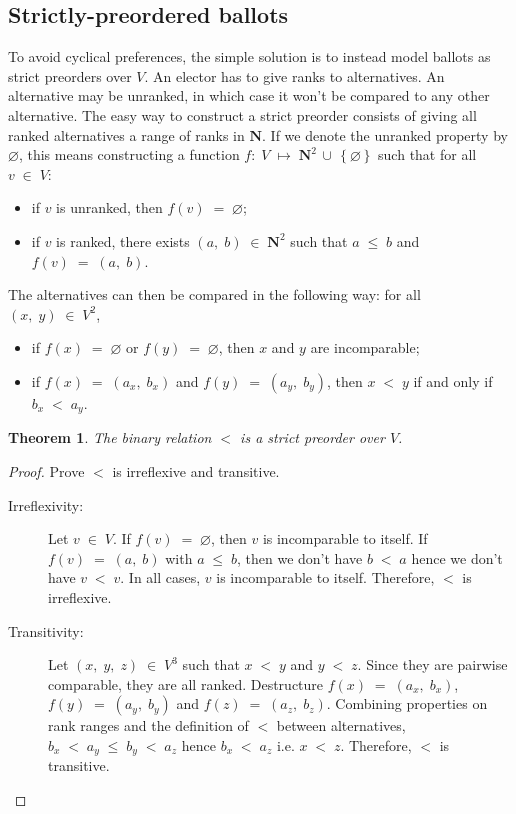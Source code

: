 \documentclass{report}
\theoremstyle{definition}
\theoremstyle{plain}
\newtheorem{thm}{Theorem}
\begin{document}
\subsection{Strictly-preordered ballots}
To avoid cyclical preferences, the simple solution is to instead model ballots
as strict preorders over $V$. An elector has to give ranks to alternatives. An
alternative may be unranked, in which case it won't be compared to any other
alternative. The easy way to construct a strict preorder consists of giving all
ranked alternatives a range of ranks in $\mathbf N$. If we denote the unranked
property by $\varnothing$, this means constructing a function
$f:\;V\;\longmapsto\;\mathbf N^2\,\cup\,\left\{\varnothing\right\}$ such that
for all $v\;\in\;V$:
\begin{itemize}
\item if $v$ is unranked, then $f\left(v\right)\;=\;\varnothing$;
\item if $v$ is ranked, there exists $\left(a,\;b\right)\;\in\;\mathbf N^2$ such
      that $a\;\leqslant\;b$ and $f\left(v\right)\;=\;\left(a,\;b\right)$.
\end{itemize}
The alternatives can then be compared in the following way: for all
$\left(x,\;y\right)\;\in\;V^2$,
\begin{itemize}
\item if $f\left(x\right)\;=\;\varnothing$ or $f\left(y\right)\;=\;\varnothing$,
      then $x$ and $y$ are incomparable;
\item if $f\left(x\right)\;=\;\left(a_x,\;b_x\right)$ and
      $f\left(y\right)\;=\;\left(a_y,\;b_y\right)$, then $x\;<\;y$ if and only
      if $b_x\;<\;a_y$.
\end{itemize}
\begin{thm}
	The binary relation $<$ is a strict preorder over $V$.
\end{thm}
\begin{proof}
	Prove $<$ is irreflexive and transitive.
	\begin{description}
	\item[Irreflexivity:]
	Let $v\;\in\;V$. If $f\left(v\right)\;=\;\varnothing$, then $v$ is
	incomparable to itself. If $f\left(v\right)\;=\;\left(a,\;b\right)$
	with $a\;\leqslant\;b$, then we don't have $b\;<\;a$ hence we don't
	have $v\;<\;v$. In all cases, $v$ is incomparable to itself. Therefore,
	$<$ is irreflexive.
	\item[Transitivity:]
	Let $\left(x,\;y,\;z\right)\;\in\;V^3$ such that $x\;<\;y$ and
	$y\;<\;z$. Since they are pairwise comparable, they are all ranked.
	Destructure $f\left(x\right)\;=\;\left(a_x,\;b_x\right)$,
	$f\left(y\right)\;=\;\left(a_y,\;b_y\right)$ and
	$f\left(z\right)\;=\;\left(a_z,\;b_z\right)$. Combining properties on
	rank ranges and the definition of $<$ between alternatives,
	$b_x\;<\;a_y\;\leqslant\;b_y\;<\;a_z$ hence $b_x\;<\;a_z$ i.e.
	$x\;<\;z$. Therefore, $<$ is transitive.
	\end{description}
\end{proof}
\end{document}
